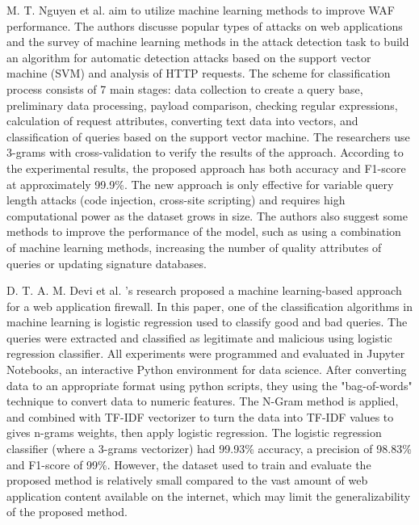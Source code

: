 M. T. Nguyen et al. \cite{Truong} aim to utilize machine learning methods to improve WAF performance. The authors discusse popular types of attacks on web applications and the survey of machine learning methods in the attack detection task to build an algorithm for automatic detection attacks based on the support vector machine (SVM) and analysis of HTTP requests. The scheme for classification process consists of 7 main stages: data  collection  to create a query base, preliminary data processing, payload comparison, checking regular expressions, calculation of request attributes, converting text data into vectors, and classification of queries based on the support vector machine. The researchers use 3-grams with cross-validation to verify the results of the approach. According to the experimental results, the proposed approach has both accuracy and F1-score at approximately 99.9\%. The new approach is only effective for variable query length attacks (code injection, cross-site scripting) and requires high computational power as the dataset grows in size. The authors also suggest some methods to improve the performance of the model, such as using a combination of machine learning methods, increasing the number of quality attributes of queries or updating signature databases.

D. T. A. M. Devi et al. \cite{Devi}'s research proposed a machine learning-based approach for a web application firewall. In this paper, one of the classification algorithms in machine learning is logistic regression used to classify good and bad queries. The queries were extracted and classified as legitimate and malicious using logistic regression classifier. All experiments were programmed and evaluated in
Jupyter Notebooks, an interactive Python environment for data science. After converting data to an appropriate format using python scripts, they using the "bag-of-words" technique to convert data to numeric features. The N-Gram method is applied, and combined with TF-IDF vectorizer to turn the data into TF-IDF values to gives n-grams weights, then apply logistic regression. The logistic regression classifier (where a 3-grams vectorizer) had 99.93\% accuracy, a precision of 98.83\% and F1-score of 99\%. However, the dataset used to train and evaluate the proposed method is relatively small compared to the vast amount of web application content available on the internet, which may limit the generalizability of the proposed method.

